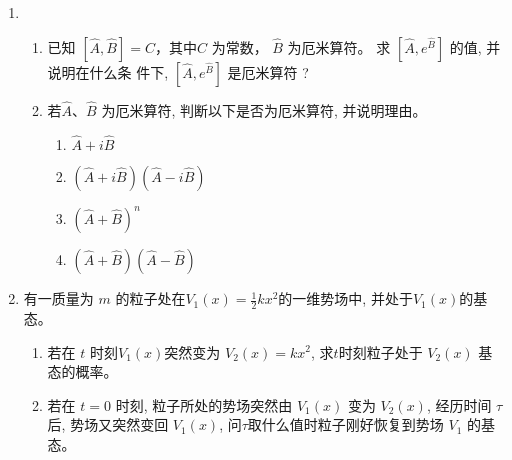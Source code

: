 
\begin{enumerate}
	\item
\begin{enumerate}
	\item
 已知 $[\hat{A}, \hat{B}]=C$，其中$C  $ 为常数， $\hat{B}$ 为厄米算符。 求 $\left[\hat{A}, e^{\hat{B}}\right]$ 的值, 并说明在什么条 件下, $\left[\hat{A}, e^{\hat{B}}\right]$ 是厄米算符 ?
	

	
\item 
若$ \hat{A} $、$ \hat{B} $ 为厄米算符, 判断以下是否为厄米算符, 并说明理由。
\begin{enumerate}
	\item
	$\hat{A}+i \hat{B}$
	\item 
	$(\hat{A}+i \hat{B})(\hat{A}-i \hat{B})$
	\item 
	$(\hat{A}+\hat{B})^{n}$
	\item 
	$(\hat{A}+\hat{B})(\hat{A}-\hat{B})$
	
	
	
\end{enumerate}

	
\end{enumerate}


\banswer{
	
}


\item
有一质量为 $m$ 的粒子处在$V_{1}(x)=\frac{1}{2} k x^{2}$的一维势场中, 并处于$ V_{1}(x) $的基态。
\begin{enumerate}
	\item
	若在 $t$ 时刻$ V_{1}(x) $突然变为 $V_{2}(x)=k x^{2}$, 求$ t $时刻粒子处于 $V_{2}(x)$ 基态的概率。
	\item 
	 若在 $t=0$ 时刻, 粒子所处的势场突然由 $V_{1}(x)$ 变为 $V_{2}(x)$, 经历时间 $\tau$ 后, 势场又突然变回 $V_{1}(x)$, 问$ \tau $取什么值时粒子刚好恢复到势场 $V_{1}$ 的基态。
	

\end{enumerate}
\end{enumerate}
